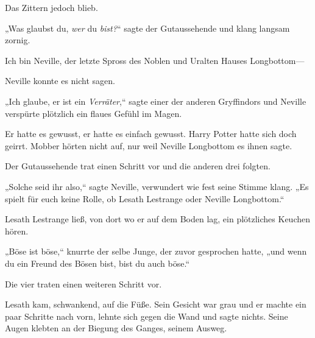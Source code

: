 Das Zittern jedoch blieb.

„Was glaubst du, \emph{wer} du \emph{bist?}“ sagte der Gutaussehende und klang langsam zornig.

Ich bin Neville, der letzte Spross des Noblen und Uralten Hauses Longbottom—

Neville konnte es nicht sagen.

„Ich glaube, er ist ein \emph{Verräter},“ sagte einer der anderen Gryffindors und Neville verspürte plötzlich ein flaues Gefühl im Magen.

Er hatte es gewusst, er hatte es einfach gewusst. Harry Potter hatte sich doch geirrt. Mobber hörten nicht auf, nur weil Neville Longbottom es ihnen sagte.

Der Gutaussehende trat einen Schritt vor und die anderen drei folgten.

„Solche seid ihr also,“ sagte Neville, verwundert wie fest seine Stimme klang. „Es spielt für euch keine Rolle, ob Lesath Lestrange oder Neville Longbottom.“

Lesath Lestrange ließ, von dort wo er auf dem Boden lag, ein plötzliches Keuchen hören.

„Böse ist böse,“ knurrte der selbe Junge, der zuvor gesprochen hatte, „und wenn du ein Freund des Bösen bist, bist du auch böse.“

Die vier traten einen weiteren Schritt vor.

Lesath kam, schwankend, auf die Füße. Sein Gesicht war grau und er machte ein paar Schritte nach vorn, lehnte sich gegen die Wand und sagte nichts. Seine Augen klebten an der Biegung des Ganges, seinem Ausweg.

